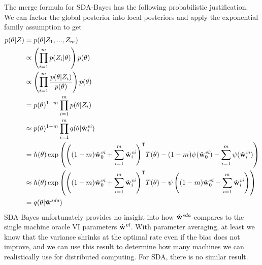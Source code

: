 \documentclass[thesis.tex]{subfiles}
\newcommand{\wvi}{\hat\w^\textit{vi}}
\newcommand{\wsda}{\hat\w^\textit{sda}}
\begin{document}
The merge formula for SDA-Bayes has the following probabilistic justification.
We can factor the global posterior into local posteriors and apply the exponential family assumption to get
\begin{align}
    p(\theta|Z) 
    &= p(\theta|Z_1,...,Z_m)
    \\
    &\propto \left( \prod_{i=1}^m p(Z_i|\theta) \right) p(\theta)
    \\
    &\propto \left( \prod_{i=1}^m \frac{p(\theta|Z_i)}{p(\theta)} \right) p(\theta)
    \\
    &= p(\theta)^{1-m} \prod_{i=1}^m p(\theta|Z_i)
    \\
    &\approx p(\theta)^{1-m} \prod_{i=1}^m q(\theta|\wvi_i)
    \\&=
    h(\theta)\exp\left(\trans{\left((1-m)\wvi_0+\sum_{i=1}^m\wvi_i\right)} T(\theta) - (1-m)\psi(\wvi_0)-\sum_{i=1}^m\psi(\wvi_i)\right)
    \\&\approx
    h(\theta)\exp\left(\trans{\left((1-m)\wvi_0+\sum_{i=1}^m\wvi_i\right)} T(\theta) - \psi\left((1-m)\wvi_0-\sum_{i=1}^m\wvi_i\right)\right)
    \\&=q(\theta|\wsda)
\end{align}
SDA-Bayes unfortunately provides no insight into how $\wsda$ compares to the single machine oracle VI parameters $\wvi$.
With parameter averaging, at least we know that the variance shrinks at the optimal rate even if the bias does not improve,
and we can use this result to determine how many machines we can realistically use for distributed computing.
For SDA, there is no similar result.

\end{document}
